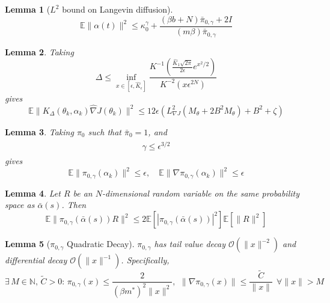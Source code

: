 \documentclass[journal,onecolumn]{IEEEtran}
\newtheorem{lemma}{Lemma}
\newcommand{\alk}{\alpha_k}
\newcommand{\thk}{\theta_k}
\newcommand{\step}{\epsilon}
\newcommand{\grad}{\nabla}
\newcommand{\gradn}{\hat{\nabla}}
\newcommand{\rew}{J}
\newcommand{\CE}{\mathbb{E}}
\newcommand{\alt}{\alpha(t)}
\newcommand{\dimn}{N}
\newcommand{\kn}{\kappa_0}
\newcommand{\knw}{\kn^{\idw}}
\newcommand{\alsbar}{\bar{\alpha}(s)}
\newcommand{\idistr}{\ids_0}
\newcommand{\K}{K}
\newcommand{\Kd}{\K_{\Delta}}
\newcommand{\N}{\mathbb{N}}
\newcommand{\etsup}{M_{\theta}}
\newcommand{\ids}{\pi}
\newcommand{\idistmax}{\bar{\ids}_0}
\newcommand{\idw}{\gamma}
\newcommand{\isp}{0,\idw}
\newcommand{\idistmaxw}{\bar{\ids}_{\isp}}
\newcommand{\tailbound}{M}
\newcommand{\idiffconst}{\tilde{C}}
\newcommand{\idiffc}{I}
\newcommand{\dissm}{m}
\newcommand{\dissb}{b}
\newcommand{\gradnvar}{\zeta}
\newcommand{\ksup}{\hat{K}}
\newcommand{\idistrw}{\ids_{\isp}}
\newcommand{\lipGJ}{L_{\grad\rew}}
\begin{document}
{\begin{lemma}[$L^2$ bound on Langevin diffusion]
\label{lem:diffbound}
\[\CE \|\alt\|^2 \leq \knw + \frac{(\beta \dissb + \dimn)\idistmaxw + 2\idiffc}{(\dissm\beta)\idistmaxw}\]
\end{lemma}

\begin{lemma}
\label{lem:Kbound} Taking 
    \begin{equation}
    \label{eq:delch}
       \Delta \leq \inf_{x \in [\step,\ksup_{\step}]}\frac{K^{-1}(\frac{\ksup_1\sqrt{2\pi}}{2\step}e^{x^2/2})}{K^{-2}(x\step^{2\dimn})}
    \end{equation}
    gives 
    \[\CE \|\Kd(\thk,\alk)\gradn \rew(\thk)\|^2\leq  12\step(\lipGJ^2(\etsup + 2B^2\etsup) + B^2 + \gradnvar)\]
\end{lemma}

\begin{lemma}
\label{lem:wcond}
Taking $\idistr$ such that $\idistmax = 1$, and 
\begin{align}
\begin{split}
\label{eq:wcond}
\idw \leq\step^{3/2}
\end{split}
\end{align}
gives
\[\CE\|\idistrw(\alk)\|^2 \leq \step , \quad \CE\|\grad\idistrw(\alk)\|^2 \leq \step \]
\end{lemma}


\begin{lemma}
\label{lem:Esplit}
    Let $R$ be an $\dimn$-dimensional random variable on the same probability space as $\alsbar$. Then 
    \[\CE \|\idistrw(\alsbar)R\|^2 \leq 2\CE \left[|\idistrw(\alsbar)|^2\right] \CE \left[\|R\|^2\right]\]
\end{lemma}


\begin{lemma}[$\idistrw$ Quadratic Decay]
\label{lem:taildecay}
$\idistrw$ has tail value decay $\mathcal{O}(\|x\|^{-2})$ and differential decay $\mathcal{O}(\|x\|^{-1})$. Specifically,  
\[\exists\, \tailbound \in \N, \, \idiffconst > 0 : \, \idistrw(x) \leq \frac{2}{(\beta m^*)^2\|x\|^2}, \ \, \|\grad\idistrw(x)\| \leq \frac{\idiffconst}{\|x\|}\ \ \forall \|x\| > \tailbound\]
\end{lemma}

}
\end{document}
